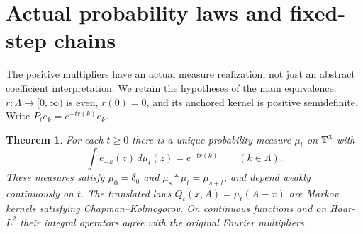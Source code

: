 \documentclass[11pt]{article}
\newtheorem{theorem}{Theorem}[section]
\theoremstyle{remark}\newtheorem{remark}[theorem]{Remark}
\begin{document}
\section{Actual probability laws and fixed-step chains}\label{sec:physical-laws}
The positive multipliers have an actual measure realization, not just
an abstract coefficient interpretation. We retain the hypotheses of the
main equivalence: $r:\Lambda\to[0,\infty)$ is even, $r(0)=0$, and its
anchored kernel is positive semidefinite. Write $P_t e_k=e^{-tr(k)}e_k$.

\begin{theorem}\label{thm:laws}
For each $t\geq0$ there is a unique probability measure $\mu_t$ on
$\mathbb T^3$ with
\[
 \int e_{-k}(z)\,d\mu_t(z)=e^{-tr(k)}\qquad(k\in\Lambda).
\]
These measures satisfy $\mu_0=\delta_0$ and
$\mu_s*\mu_t=\mu_{s+t}$, and depend weakly continuously on $t$.
The translated laws $Q_t(x,A)=\mu_t(A-x)$ are Markov kernels satisfying
Chapman--Kolmogorov. On continuous functions and on Haar-$L^2$ their
integral operators agree with the original Fourier multipliers.
\end{theorem}
\end{document}
